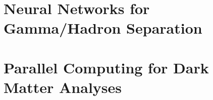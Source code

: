 \section{Neural Networks for Gamma/Hadron Separation}

\section{Parallel Computing for Dark Matter Analyses}
